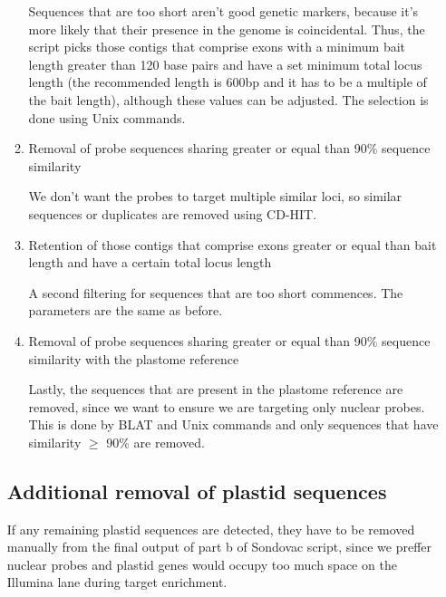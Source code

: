 \begin{enumerate}
\begin{enumerate}
Sequences that are too short aren't good genetic markers, because it's more likely that their presence in the genome is coincidental. Thus, the script picks those contigs that 
comprise exons with a minimum bait length greater than 120 base pairs and have a set minimum total locus length (the recommended length is 600bp and it has to be a multiple of 
the bait length), although these values can be adjusted. The selection is done using Unix commands. 

\item Removal of probe sequences sharing greater or equal than 90\% sequence similarity

We don't want the probes to target multiple similar loci, so similar sequences or duplicates are removed using CD-HIT. 

\item Retention of those contigs that comprise exons greater or equal than bait length and have a certain total locus length

A second filtering for sequences that are too short commences. The parameters are the same as before. 

\item Removal of probe sequences sharing greater or equal than 90\% sequence similarity with the plastome reference

Lastly, the sequences that are present in the plastome reference are removed, since we want to ensure we are targeting only nuclear probes. This is done by BLAT and Unix commands and 
only sequences that have similarity $\geq$ 90\% are removed. 

\end{enumerate}

\subsection{Additional removal of plastid sequences}

If any remaining plastid sequences are detected, they have to be removed manually from the final output of part b of Sondovac script, since we preffer nuclear probes and 
plastid genes would occupy too much space on the Illumina lane during target enrichment. 

\end{enumerate}

